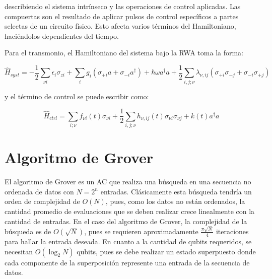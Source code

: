\documentclass[11pt, spanish]{report}
\begin{document}
describiendo el sistema intrínseco y las operaciones de control aplicadas. Las compuertas son el resultado de aplicar pulsos de control específicos a partes selectas de un circuito físico. Esto afecta varios términos del Hamiltoniano, haciéndolos dependientes del tiempo.

Para el transmonio, el Hamiltoniano del sistema bajo la RWA toma la forma:

\[
\hat{H}_{syst} = -\frac{1}{2} \sum\limits_{\nu i} \epsilon_i \sigma_{z i} + \sum\limits_{i} g_i (\sigma_{+ i} a + \sigma_{- i} a^\dag) + \hbar \omega a^\dag a + \frac{1}{2} \sum\limits_{i,j;\nu} \lambda_{\nu, ij} (\sigma_{+ i} \sigma_{- j} + \sigma_{- i} \sigma_{+ j})
\]

y el término de control se puede escribir como:

\[
\hat{H}_{ctrl} = \sum\limits_{i; \nu} f_{\nu i}(t) \sigma_{\nu i} + \frac{1}{2} \sum\limits_{i,j;\nu} h_{\nu, ij}(t) \sigma_{\nu i} \sigma_{\nu j} + k(t) a^\dag a
\]



\chapter{Algoritmo de Grover}

El algoritmo de Grover es un AC que realiza una búsqueda en una secuencia no ordenada de datos con $N=2^n$ entradas. Clásicamente esta búsqueda tendría un orden de complejidad de $O(N)$, pues, como los datos no están ordenados, la cantidad promedio de evaluaciones que se deben realizar crece linealmente con la cantidad de entradas. En el caso del algoritmo de Grover, la complejidad de la búsqueda es de $O(\sqrt{N})$, pues se requieren aproximadamente $\frac{\pi\sqrt{N}}{4}$ iteraciones para hallar la entrada deseada. En cuanto a la cantidad de qubits requeridos, se necesitan $O(\log_2 N)$ qubits, pues se debe realizar un estado superpuesto donde cada componente de la superposición represente una entrada de la secuencia de datos.
\end{document}

